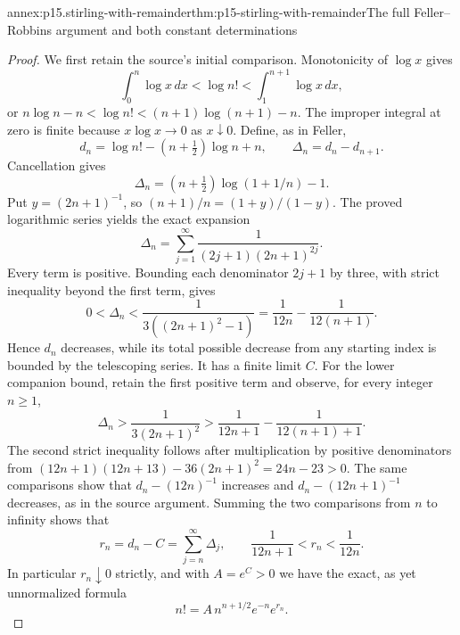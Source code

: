 \begin{annexitem}{annex:p15.stirling-with-remainder}{thm:p15-stirling-with-remainder}{The full Feller--Robbins argument and both constant determinations}
\begin{proof}
We first retain the source's initial comparison.
Monotonicity of \(\log x\) gives
\[
 \int_0^n\log x\,dx<\log n!<
                    \int_1^{n+1}\log x\,dx,
\]
or \(n\log n-n<\log n!<(n+1)\log(n+1)-n\).
The improper integral at zero is finite because
\(x\log x\to0\) as \(x\downarrow0\).
Define, as in Feller,
\[
 d_n=\log n!-(n+\tfrac12)\log n+n,\qquad
 \Delta_n=d_n-d_{n+1}.
\]
Cancellation gives
\[
 \Delta_n=(n+\tfrac12)\log(1+1/n)-1.
\]
Put \(y=(2n+1)^{-1}\), so
\((n+1)/n=(1+y)/(1-y)\).
The proved logarithmic series yields the exact expansion
\[
 \Delta_n=\sum_{j=1}^\infty
                 \frac{1}{(2j+1)(2n+1)^{2j}}.
\]
Every term is positive. Bounding each denominator \(2j+1\)
by three, with strict inequality beyond the first term, gives
\[
 0<\Delta_n<
 \frac1{3((2n+1)^2-1)}
     =\frac1{12n}-\frac1{12(n+1)}.
\]
Hence \(d_n\) decreases, while its total possible decrease
from any starting index is bounded by the telescoping series.
It has a finite limit \(C\).
For the lower companion bound, retain the first positive
term and observe, for every integer \(n\geq1\),
\[
 \Delta_n>\frac1{3(2n+1)^2}>
           \frac1{12n+1}-\frac1{12(n+1)+1}.
\]
The second strict inequality follows after multiplication
by positive denominators from
\((12n+1)(12n+13)-36(2n+1)^2=24n-23>0\).
The same comparisons show that \(d_n-(12n)^{-1}\) increases
and \(d_n-(12n+1)^{-1}\) decreases, as in the source argument.
Summing the two comparisons from \(n\) to infinity shows that
\[
 r_n=d_n-C=\sum_{j=n}^\infty\Delta_j,\qquad
 \frac1{12n+1}<r_n<\frac1{12n}.
\]
In particular \(r_n\downarrow0\) strictly, and with \(A=e^C>0\)
we have the exact, as yet unnormalized formula
\[
 n!=A\,n^{n+1/2}e^{-n}e^{r_n}.
\]


\end{proof}
\end{annexitem}
